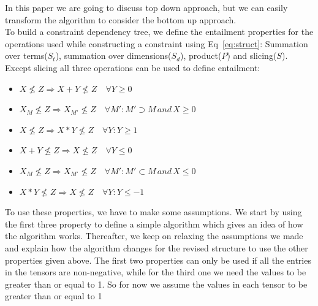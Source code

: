 \documentclass{article}
\begin{document}
In this paper we are going to discuss top down approach, but we can easily transform the algorithm to consider the bottom up approach. 
\\
To build a constraint dependency tree, we define the entailment properties for the operations used while constructing a constraint using Eq~\ref{eq:struct}: Summation over terms($S_t$), summation over dimensions($S_d$), product($P$) and slicing($S$). Except slicing all three operations can be used to define entailment:
\begin{itemize}
\item $X \not\le Z \Rightarrow X + Y \not\le Z \quad \forall Y \geq 0$
\item $X_{M} \not\le Z \Rightarrow X_{M'} \not\le Z \quad \forall M': M' \supset M \, and \, X \geq 0$
\item $X \not\le Z \Rightarrow X * Y \not\le Z \quad \forall Y: Y \geq 1$
\item $X + Y \not\le Z \Rightarrow X \not\le Z \quad \forall Y \le 0$
\item $X_{M} \not\le Z \Rightarrow X_{M'} \not\le Z \quad \forall M': M' \subset M \, and \, X \le 0$
\item $X * Y \not\le Z \Rightarrow X \not\le Z \quad \forall Y: Y \le -1$
\end{itemize}


To use these properties, we have to make some assumptions. We start by using the first three property to define a simple algorithm which gives an idea of how the algorithm works. Thereafter, we keep on relaxing the assumptions we made and explain how the algorithm changes for the revised structure to use the other properties given above. The first two properties can only be used if all the entries in the tensors are non-negative, while for the third one we need the values to be greater than or equal to 1. So for now we assume the values in each tensor to be greater than or equal to 1
\end{document}
